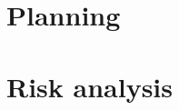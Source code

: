 \documentclass{report}
\begin{document}
	\chapter{Planning}\label{plan}
	
	
	
	
	
	\chapter{Risk analysis}
	
	
	
	\printbibliography
	
\end{document}
